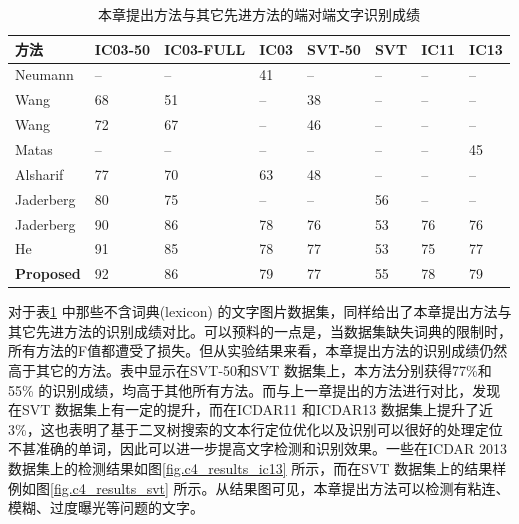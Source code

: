        \begin{table}[!h]
        \centering
        \caption{本章提出方法与其它先进方法的端对端文字识别成绩}
        \begin{tabular}{p{} p{} p{} p{} p{} p{} p{} p{} }
        \toprule
        方法 & IC03-50 & IC03-FULL & IC03 & SVT-50 & SVT & IC11 & IC13  \\
        \midrule
        Neumann\cite{Neumann2010A} & -- & -- & 41 & -- & -- & -- & -- \\
        Wang\cite{Wang2012End} & 68 & 51 & -- & 38 & -- & -- & -- \\
        Wang\cite{Wang2012End} & 72 & 67 & -- & 46 & -- & -- & -- \\
        Matas\cite{Matas2014Scene} & -- & -- & -- & -- & -- & -- & 45 \\
        Alsharif\cite{Alsharif2013End} & 77 & 70 & 63 & 48 & -- & -- & -- \\
        Jaderberg\cite{Jaderberg2014Deep} & 80 & 75 & -- & -- & 56 & -- & -- \\
        Jaderberg\cite{Jaderberg2016Reading} & 90 & 86 & 78 & 76 & 53 & 76 & 76 \\
        He\cite{He2017scene} & 91 & 85 & 78 & 77 & 53 & 75 & 77 \\
        \textbf{Proposed} & 92 & 86 & 79 & 77 & 55 & 78 & 79 \\
        \bottomrule
        \end{tabular}
        \label{tab.c4_recognition}
        \end{table}

        对于表\ref{tab.c4_recognition} 中那些不含词典(lexicon) 的文字图片数据集，同样给出了本章提出方法与其它先进方法的识别成绩对比。可以预料的一点是，当数据集缺失词典的限制时，所有方法的F值都遭受了损失。但从实验结果来看，本章提出方法的识别成绩仍然高于其它的方法。表中显示在SVT-50和SVT 数据集上，本方法分别获得77\%和55\% 的识别成绩，均高于其他所有方法。而与上一章提出的方法进行对比，发现在SVT 数据集上有一定的提升，而在ICDAR11 和ICDAR13 数据集上提升了近3\%，这也表明了基于二叉树搜索的文本行定位优化以及识别可以很好的处理定位不甚准确的单词，因此可以进一步提高文字检测和识别效果。一些在ICDAR 2013数据集上的检测结果如图\ref{fig.c4_results_ic13} 所示，而在SVT 数据集上的结果样例如图\ref{fig.c4_results_svt} 所示。从结果图可见，本章提出方法可以检测有粘连、模糊、过度曝光等问题的文字。


